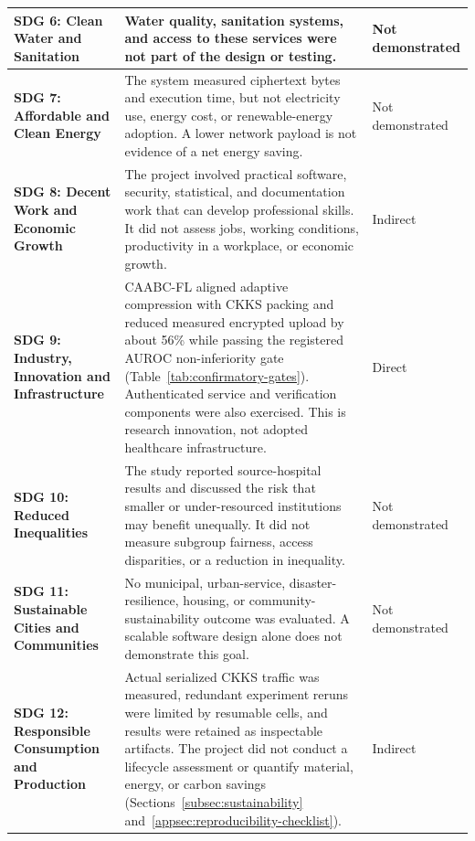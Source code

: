 \begin{longtable}{|p{3.5cm}|p{7.4cm}|p{1.8cm}|}
\textbf{SDG 6: Clean Water and Sanitation} &
Water quality, sanitation systems, and access to these services were not part of the design or testing. &
Not demonstrated \\
\hline

\textbf{SDG 7: Affordable and Clean Energy} &
The system measured ciphertext bytes and execution time, but not electricity use, energy cost, or renewable-energy adoption. A lower network payload is not evidence of a net energy saving. &
Not demonstrated \\
\hline

\textbf{SDG 8: Decent Work and Economic Growth} &
The project involved practical software, security, statistical, and documentation work that can develop professional skills. It did not assess jobs, working conditions, productivity in a workplace, or economic growth. &
Indirect \\
\hline

\textbf{SDG 9: Industry, Innovation and Infrastructure} &
CAABC-FL aligned adaptive compression with CKKS packing and reduced measured encrypted upload by about 56\% while passing the registered AUROC non-inferiority gate (Table~\ref{tab:confirmatory-gates}). Authenticated service and verification components were also exercised. This is research innovation, not adopted healthcare infrastructure. &
Direct \\
\hline

\textbf{SDG 10: Reduced Inequalities} &
The study reported source-hospital results and discussed the risk that smaller or under-resourced institutions may benefit unequally. It did not measure subgroup fairness, access disparities, or a reduction in inequality. &
Not demonstrated \\
\hline

\textbf{SDG 11: Sustainable Cities and Communities} &
No municipal, urban-service, disaster-resilience, housing, or community-sustainability outcome was evaluated. A scalable software design alone does not demonstrate this goal. &
Not demonstrated \\
\hline

\textbf{SDG 12: Responsible Consumption and Production} &
Actual serialized CKKS traffic was measured, redundant experiment reruns were limited by resumable cells, and results were retained as inspectable artifacts. The project did not conduct a lifecycle assessment or quantify material, energy, or carbon savings (Sections~\ref{subsec:sustainability} and~\ref{appsec:reproducibility-checklist}). &
Indirect \\
\hline


\end{longtable}

